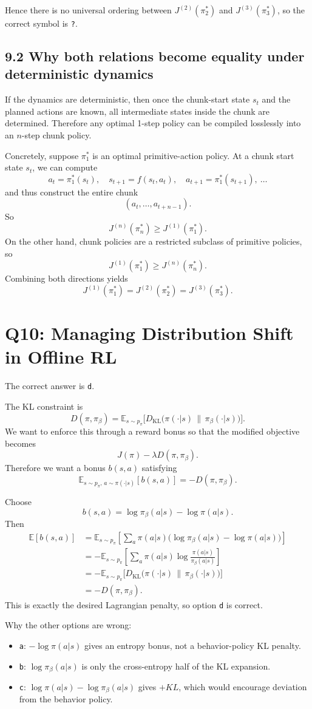 \documentclass[11pt]{article}
\newcommand{\E}{\mathbb{E}}
\newcommand{\KL}{D_{\mathrm{KL}}}
\newcommand{\1}{\mathbf{1}}
\begin{document}
Hence there is no universal ordering between $J^{(2)}(\pi_2^*)$ and $J^{(3)}(\pi_3^*)$, so the correct symbol is \texttt{?}.

\subsection*{9.2 Why both relations become equality under deterministic dynamics}
If the dynamics are deterministic, then once the chunk-start state $s_t$ and the planned actions are known, all intermediate states inside the chunk are determined. Therefore any optimal 1-step policy can be compiled losslessly into an $n$-step chunk policy.

Concretely, suppose $\pi_1^*$ is an optimal primitive-action policy. At a chunk start state $s_t$, we can compute
\[
a_t=\pi_1^*(s_t),\quad
s_{t+1}=f(s_t,a_t),\quad
a_{t+1}=\pi_1^*(s_{t+1}),\ \dots
\]
and thus construct the entire chunk
\[
(a_t,\dots,a_{t+n-1}).
\]
So
\[
J^{(n)}(\pi_n^*)\ge J^{(1)}(\pi_1^*).
\]
On the other hand, chunk policies are a restricted subclass of primitive policies, so
\[
J^{(1)}(\pi_1^*)\ge J^{(n)}(\pi_n^*).
\]
Combining both directions yields
\[
J^{(1)}(\pi_1^*)=J^{(2)}(\pi_2^*)=J^{(3)}(\pi_3^*).
\]

\section{Q10: Managing Distribution Shift in Offline RL}
The correct answer is \texttt{d}.

The KL constraint is
\[
D(\pi,\pi_\beta)
=
\E_{s\sim p_\pi}
\Big[
\KL\big(\pi(\cdot|s)\,\|\,\pi_\beta(\cdot|s)\big)
\Big].
\]
We want to enforce this through a reward bonus so that the modified objective becomes
\[
J(\pi)-\lambda D(\pi,\pi_\beta).
\]
Therefore we want a bonus $b(s,a)$ satisfying
\[
\E_{s\sim p_\pi,\,a\sim \pi(\cdot|s)}[b(s,a)]
=
-D(\pi,\pi_\beta).
\]

Choose
\[
b(s,a)=\log \pi_\beta(a|s)-\log \pi(a|s).
\]
Then
\[
\begin{aligned}
\E[b(s,a)]
&=
\E_{s\sim p_\pi}
\left[
\sum_a \pi(a|s)\big(\log \pi_\beta(a|s)-\log \pi(a|s)\big)
\right] \\
&=
-\E_{s\sim p_\pi}
\left[
\sum_a \pi(a|s)\log\frac{\pi(a|s)}{\pi_\beta(a|s)}
\right] \\
&=
-\E_{s\sim p_\pi}
\Big[
\KL\big(\pi(\cdot|s)\,\|\,\pi_\beta(\cdot|s)\big)
\Big] \\
&=
-D(\pi,\pi_\beta).
\end{aligned}
\]
This is exactly the desired Lagrangian penalty, so option \texttt{d} is correct.

Why the other options are wrong:
\begin{itemize}[leftmargin=2em]
\item \texttt{a}: $-\log \pi(a|s)$ gives an entropy bonus, not a behavior-policy KL penalty.
\item \texttt{b}: $\log \pi_\beta(a|s)$ is only the cross-entropy half of the KL expansion.
\item \texttt{c}: $\log \pi(a|s)-\log \pi_\beta(a|s)$ gives $+KL$, which would encourage deviation from the behavior policy.
\end{itemize}
\end{document}
